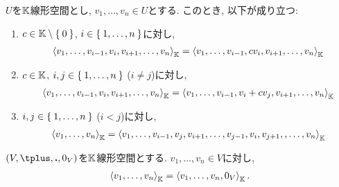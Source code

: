 \begin{lemma}
  $U$を$\mathbb{K}$線形空間とし,
  $v_1,\ldots,v_n\in U$とする.
  このとき, 以下が成り立つ:
  \begin{enumerate}
  \item
    $c\in \mathbb{K}\setminus\Set{0}$, $i\in\Set{1,\ldots,n}$に対し,
    \begin{align*}
      \Braket{v_1,\ldots,v_{i-1},v_{i},v_{i+1},\ldots,v_n}_{\mathbb{K}}=
      \Braket{v_1,\ldots,v_{i-1},cv_{i},v_{i+1},\ldots,v_n}_{\mathbb{K}}
    \end{align*}
  \item
    $c\in \mathbb{K}$, $i,j\in\Set{1,\ldots,n}$ ($i\neq j$)に対し,
    \begin{align*}
      \Braket{v_1,\ldots,v_{i-1},v_{i},v_{i+1},\ldots,v_n}_{\mathbb{K}}=
      \Braket{v_1,\ldots,v_{i-1},v_i+cv_{j},v_{i+1},\ldots,v_n}_{\mathbb{K}}
    \end{align*}
  \item
    $i,j\in\Set{1,\ldots,n}$ ($i< j$)に対し,
    \begin{align*}
      \Braket{v_1,\ldots,v_n}_{\mathbb{K}}=
      \Braket{v_1,\ldots,v_{i-1},v_j,v_{i+1},\ldots,v_{j-1},v_i,v_{j+1},,\ldots,v_n}_{\mathbb{K}}
    \end{align*}
  \end{enumerate}
\end{lemma}

\begin{lemma}
  $(V,\plus,\act,0_V)$を$\mathbb{K}$線形空間とする.
  $v_1,\ldots,v_n\in V$に対し,
    \begin{align*}
      \Braket{v_1,\ldots,v_n}_{\mathbb{K}}=
      \Braket{v_1,\ldots,v_n,0_V}_{\mathbb{K}}.
    \end{align*}
\end{lemma}

